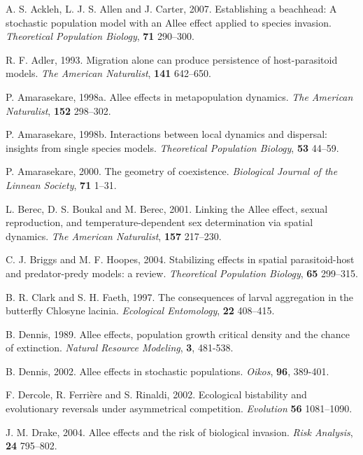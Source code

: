 \begin{thebibliography}{10}

 A. S. Ackleh, L. J. S. Allen and J. Carter, 2007.
 Establishing a beachhead: A stochastic population model with an Allee effect applied to species invasion.
\emph{Theoretical Population Biology}, \textbf{71} 290--300.

 R. F. Adler, 1993.
 Migration alone can produce persistence of host-parasitoid models.
\emph{The American Naturalist}, \textbf{141} 642--650.

 P. Amarasekare, 1998a.
 Allee effects in metapopulation dynamics.
\emph{The American Naturalist}, \textbf{152} 298--302.

 P. Amarasekare, 1998b.
 Interactions between local dynamics and dispersal: insights from single species models.
\emph{Theoretical Population Biology}, \textbf{53} 44--59.

 P. Amarasekare, 2000.
 The geometry of coexistence.
\emph{Biological Journal of the Linnean Society}, \textbf{71} 1--31.

 L. Berec, D. S. Boukal and M. Berec, 2001.
 Linking the Allee effect, sexual reproduction, and temperature-dependent sex determination via spatial dynamics.
\emph{The American Naturalist}, \textbf{157} 217--230.

 C. J. Briggs and M. F. Hoopes, 2004.
 Stabilizing effects in spatial parasitoid-host and predator-predy models: a review.
\emph{Theoretical Population Biology}, \textbf{65} 299--315.

 B. R. Clark and S. H. Faeth, 1997.
 The consequences of larval aggregation in the butterfly Chlosyne lacinia.
\emph{Ecological Entomology}, \textbf{22} 408--415.

B. Dennis, 1989. Allee effects, population growth critical density and the chance of extinction. \emph{Natural Resource Modeling}, \textbf{3}, 481-538.

B. Dennis, 2002. Allee effects in stochastic populations. \emph{Oikos}, \textbf{96}, 389-401. 

 F. Dercole, R. Ferri\`ere and S. Rinaldi, 2002.
 Ecological bistability and evolutionary reversals under asymmetrical competition.
\emph{Evolution} \textbf{56} 1081--1090.

 J. M. Drake, 2004.
 Allee effects and the risk of biological invasion.
\emph{Risk Analysis}, \textbf{24} 795--802.


\end{thebibliography}
